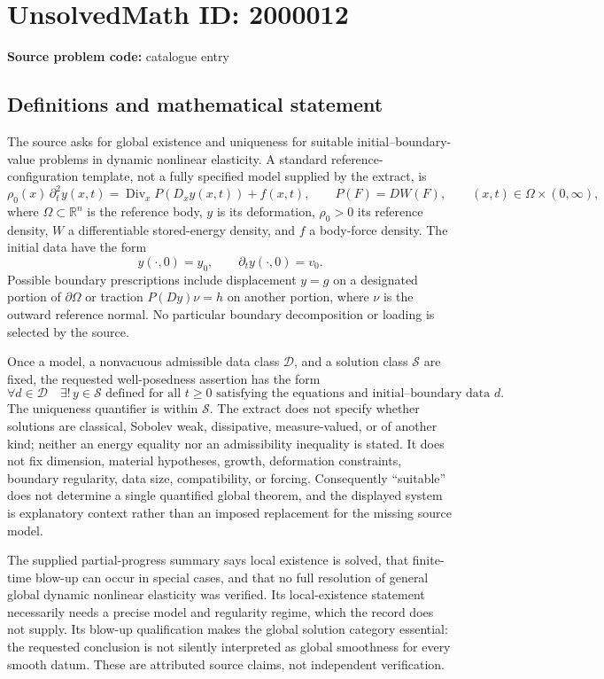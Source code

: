 \documentclass[11pt]{article}
\newcommand{\R}{\mathbb{R}}
\begin{document}
\section*{UnsolvedMath ID: 2000012}
\textbf{Source problem code:} catalogue entry
\subsection{Definitions and mathematical statement}
The source asks for global existence and uniqueness for suitable initial--boundary-value problems in dynamic nonlinear elasticity. A standard reference-configuration template, not a fully specified model supplied by the extract, is
\[
\rho_0(x)\,\partial_t^2 y(x,t)=\operatorname{Div}_x P(D_x y(x,t))+f(x,t),
\qquad P(F)=D W(F),\qquad (x,t)\in\Omega\times(0,\infty),
\]
where $\Omega\subset\R^n$ is the reference body, $y$ is its deformation, $\rho_0>0$ its reference density, $W$ a differentiable stored-energy density, and $f$ a body-force density. The initial data have the form
\[
y(\cdot,0)=y_0,\qquad \partial_t y(\cdot,0)=v_0.
\]
Possible boundary prescriptions include displacement $y=g$ on a designated portion of $\partial\Omega$ or traction $P(Dy)\nu=h$ on another portion, where $\nu$ is the outward reference normal. No particular boundary decomposition or loading is selected by the source.

Once a model, a nonvacuous admissible data class $\mathcal D$, and a solution class $\mathcal S$ are fixed, the requested well-posedness assertion has the form
\[
\forall d\in\mathcal D\quad
\exists!\, y\in\mathcal S\text{ defined for all }t\ge0
\text{ satisfying the equations and initial--boundary data }d.
\]
The uniqueness quantifier is within $\mathcal S$. The extract does not specify whether solutions are classical, Sobolev weak, dissipative, measure-valued, or of another kind; neither an energy equality nor an admissibility inequality is stated. It does not fix dimension, material hypotheses, growth, deformation constraints, boundary regularity, data size, compatibility, or forcing. Consequently ``suitable'' does not determine a single quantified global theorem, and the displayed system is explanatory context rather than an imposed replacement for the missing source model.

The supplied partial-progress summary says local existence is solved, that finite-time blow-up can occur in special cases, and that no full resolution of general global dynamic nonlinear elasticity was verified. Its local-existence statement necessarily needs a precise model and regularity regime, which the record does not supply. Its blow-up qualification makes the global solution category essential: the requested conclusion is not silently interpreted as global smoothness for every smooth datum. These are attributed source claims, not independent verification.
\end{document}
